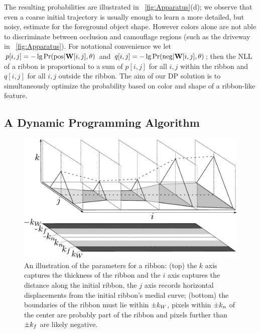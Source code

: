 \FloatBarrier

The resulting probabilities are illustrated in
\figname{}~\ref{fig:Apparatus}(d); we observe that even a coarse initial
trajectory is usually enough to learn a more detailed, but noisy, estimate for
the foreground object shape. However colors alone are not able to discriminate
between occlusion and camouflage regions (such as the driveway in
\figname{}~\ref{fig:Apparatus}). For notational convenience we let
$p[i,j]=-\lg \Pr(\text{pos}|\mathbf{W}{}[i,j], \theta)$ and 
$q[i,j]=-\lg \Pr(\text{neg}|\mathbf{W}{}[i,j], \theta)$;
then the \ac{NLL} of a ribbon is proportional to a sum of $p[i,j]$ for all
$i,j$ within the ribbon and $q[i,j]$ for all $i,j$ outside the ribbon. The aim
of our \ac{DP} solution is to simultaneously optimize the probability based on
color and shape of a ribbon-like feature. 


\subsection{A Dynamic Programming Algorithm}

\begin{figure}[htb]
    \centering
    \includegraphics[width=0.95\columnwidth]{Figures/ribbon-3d-combined.pdf}
    \caption[3D Ribbon Image]{An illustration of the parameters for a ribbon: (top) the $k$ axis captures the thickness of the ribbon and the $i$ axis captures the distance along the initial ribbon, the $j$ axis records horizontal displacements from the initial ribbon's medial curve; (bottom) the boundaries of the ribbon must lie within $\pm k_W{}$, pixels within $\pm k_n{}$ of the center are probably part of the ribbon and pixels further than $\pm k_f{}$ are likely negative. }
    \label{fig:ribbon_3d}
\end{figure}

